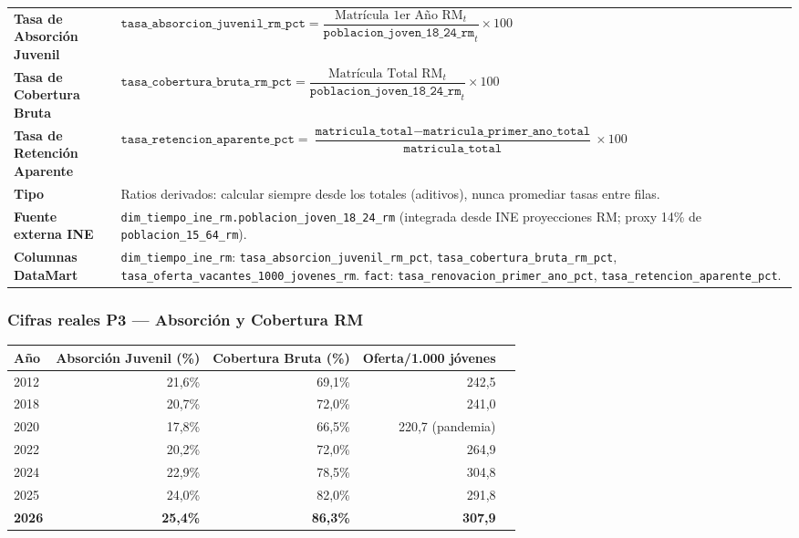 \documentclass[11pt,a4paper]{article}
\begin{document}
\begin{center}\small
\begin{tabularx}{\textwidth}{@{}>{\bfseries}p{4.5cm}Y@{}}
\toprule
Tasa de Absorción Juvenil &
  $\texttt{tasa\_absorcion\_juvenil\_rm\_pct} =
    \dfrac{\text{Matrícula 1er Año RM}_t}{\texttt{poblacion\_joven\_18\_24\_rm}_t} \times 100$ \\[6pt]
Tasa de Cobertura Bruta &
  $\texttt{tasa\_cobertura\_bruta\_rm\_pct} =
    \dfrac{\text{Matrícula Total RM}_t}{\texttt{poblacion\_joven\_18\_24\_rm}_t} \times 100$ \\[6pt]
Tasa de Retención Aparente &
  $\texttt{tasa\_retencion\_aparente\_pct} =
    \dfrac{\texttt{matricula\_total} - \texttt{matricula\_primer\_ano\_total}}
           {\texttt{matricula\_total}} \times 100$ \\[4pt]
Tipo &
  Ratios derivados: calcular siempre desde los totales (aditivos), nunca
  promediar tasas entre filas. \\
Fuente externa INE &
  \texttt{dim\_tiempo\_ine\_rm.poblacion\_joven\_18\_24\_rm} (integrada desde
  INE proyecciones RM; proxy 14\% de \texttt{poblacion\_15\_64\_rm}). \\
Columnas DataMart &
  \texttt{dim\_tiempo\_ine\_rm}: \texttt{tasa\_absorcion\_juvenil\_rm\_pct},
  \texttt{tasa\_cobertura\_bruta\_rm\_pct}, \texttt{tasa\_oferta\_vacantes\_1000\_jovenes\_rm}.
  \texttt{fact}: \texttt{tasa\_renovacion\_primer\_ano\_pct},
  \texttt{tasa\_retencion\_aparente\_pct}. \\
\bottomrule
\end{tabularx}
\end{center}

\subsubsection{Cifras reales P3 — Absorción y Cobertura RM}

\begin{center}\small
\begin{tabular}{@{}lrrrr@{}}
\toprule
\textbf{Año} & \textbf{Absorción Juvenil (\%)} &
\textbf{Cobertura Bruta (\%)} & \textbf{Oferta/1.000 jóvenes} \\
\midrule
2012 & 21,6\% & 69,1\% & 242,5 \\
2018 & 20,7\% & 72,0\% & 241,0 \\
2020 & 17,8\% & 66,5\% & 220,7 \quad (pandemia) \\
2022 & 20,2\% & 72,0\% & 264,9 \\
2024 & 22,9\% & 78,5\% & 304,8 \\
2025 & 24,0\% & 82,0\% & 291,8 \\
\textbf{2026} & \textbf{25,4\%} & \textbf{86,3\%} & \textbf{307,9} \\
\bottomrule
\end{tabular}
\end{center}
\end{document}
